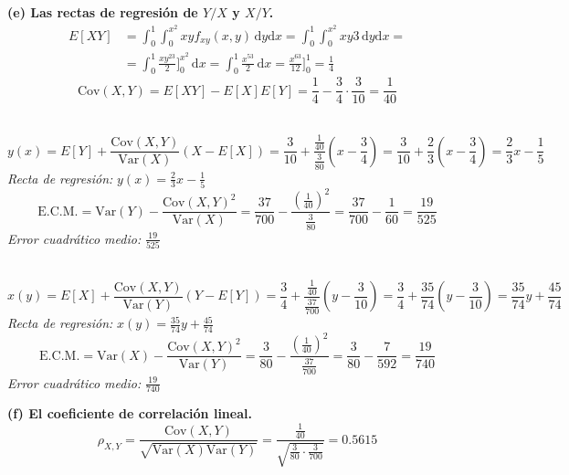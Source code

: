 \documentclass[11pt]{article}
\begin{document}
\vspace{0.5cm}
\textbf{(e) Las rectas de regresión de $Y/X$ y $X/Y$.}\\

\begin{align*}
E[XY] &= \int_{0}^{1}\int_{0}^{x^2}xyf_{xy}(x,y)\,\mathrm{d}y\mathrm{d}x =
\int_{0}^{1}\int_{0}^{x^2}xy3\,\mathrm{d}y\mathrm{d}x =\\
&= \int_{0}^{1}\frac{xy^23}{2}\Bigg]_{0}^{x^2}\,\mathrm{d}x =
\int_{0}^{1}\frac{x^53}{2}\,\mathrm{d}x = \frac{x^63}{12}\Bigg]_{0}^{1} = \frac14
\end{align*}
\begin{equation*}
\mathrm{Cov}(X,Y)= E[XY]-E[X]E[Y] = \frac14 - \frac34\cdot\frac{3}{10} = \frac{1}{40}
\end{equation*}

\\

\begin{equation*}
y(x) = E[Y] + \frac{\mathrm{Cov}(X,Y)}{\mathrm{Var}(X)}(X-E[X]) = \frac{3}{10} +
\frac{\frac{1}{40}}{\frac{3}{80}}(x-\frac34) = \frac{3}{10} + \frac23(x-\frac34) = 
\frac23x - \frac15
\end{equation*}
\textit{Recta de regresión: } $y(x) = \frac23x - \frac15$
\begin{equation*}
\mathrm{E.C.M.} = \mathrm{Var}(Y) - \frac{\mathrm{Cov}(X,Y)^2}{\mathrm{Var}(X)} =
\frac{37}{700} - \frac{(\frac{1}{40})^2}{\frac{3}{80}} = \frac{37}{700} - 
\frac{1}{60} = \frac{19}{525}
\end{equation*}
\textit{Error cuadrático medio: } $\frac{19}{525}$

\\

\begin{equation*}
x(y) = E[X] + \frac{\mathrm{Cov}(X,Y)}{\mathrm{Var}(Y)}(Y-E[Y]) = \frac34 +
\frac{\frac{1}{40}}{\frac{37}{700}}(y-\frac{3}{10}) = \frac34 + \frac{35}{74}
(y-\frac{3}{10}) = \frac{35}{74}y + \frac{45}{74}
\end{equation*}
\textit{Recta de regresión: } $x(y) = \frac{35}{74}y + \frac{45}{74}$
\begin{equation*}
\mathrm{E.C.M.} = \mathrm{Var}(X) - \frac{\mathrm{Cov}(X,Y)^2}{\mathrm{Var}(Y)} =
\frac{3}{80} - \frac{(\frac{1}{40})^2}{\frac{37}{700}} = \frac{3}{80} - 
\frac{7}{592} = \frac{19}{740}
\end{equation*}
\textit{Error cuadrático medio: } $\frac{19}{740}$

\vspace{0.5cm}
\textbf{(f) El coeficiente de correlación lineal.}\\

\begin{equation*}
\rho_{X,Y} = \frac{\mathrm{Cov}(X,Y)}{\sqrt{\mathrm{Var}(X)\mathrm{Var}(Y)}} =
\frac{\frac{1}{40}}{\sqrt{\frac{3}{80}\cdot\frac{3}{700}}} = 0.5615
\end{equation*}
\end{document}
